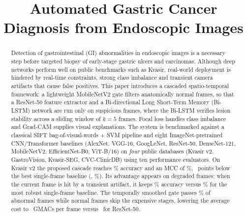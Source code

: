 \documentclass[conference]{IEEEtran}
\begin{document}
\title{Automated Gastric Cancer Diagnosis from Endoscopic Images}

\author{
\and
{}
\and
{}
}

\maketitle

\begin{abstract}
Detection of gastrointestinal (GI) abnormalities in endoscopic images is a necessary step before targeted biopsy of
early-stage gastric ulcers and carcinomas. Although deep networks perform well on public benchmarks such as Kvasir,
real-world deployment is hindered by real-time constraints, strong class imbalance and transient camera artifacts that
cause false positives. This paper introduces a cascaded spatio-temporal framework: a lightweight MobileNetV2 gate
filters anatomically normal frames, so that a ResNet-50 feature extractor and a Bi-directional Long Short-Term Memory
(Bi-LSTM) network are run only on suspicious frames, where the Bi-LSTM verifies lesion stability across a sliding
window of $k=5$ frames. Focal loss handles class imbalance and Grad-CAM supplies visual explanations. The system is
benchmarked against a classical SIFT bag-of-visual-words + SVM pipeline and eight ImageNet-pretrained CNN/Transformer
baselines (AlexNet, VGG-16, GoogLeNet, ResNet-50, DenseNet-121, MobileNetV2, EfficientNet-B0, ViT-B/16) on
\emph{four} public databases (Kvasir v2, GastroVision, Kvasir-SEG, CVC-ClinicDB) using ten performance
evaluators. On Kvasir v2 the proposed cascade reaches \Rpropacc\% accuracy and an MCC of \Rpropmcc\%, \Rgapbest\ points
below the best single-frame baseline (\Rbestbase, \Rbestbaseacc\%). Its advantage appears on degraded frames: when the current
frame is hit by a transient artifact, it keeps \Rrobtransient\% accuracy versus \Rrobbestbaseacc\% for the most robust
single-frame baseline. The temporally smoothed gate passes \Rgaterec\% of abnormal frames while normal frames skip the
expensive stages, lowering the average cost to \Rcasgmacs\ GMACs per frame versus \Rgmacsresnet\ for ResNet-50.
\end{abstract}
\end{document}
